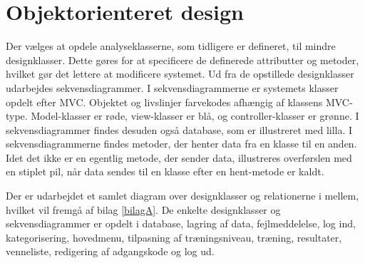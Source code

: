 \section{Objektorienteret design}
Der vælges at opdele analyseklasserne, som tidligere er defineret, til mindre designklasser. Dette gøres for at specificere de definerede attributter og metoder, hvilket gør det lettere at modificere systemet. Ud fra de opstillede designklasser udarbejdes sekvensdiagrammer. I sekvensdiagrammerne er systemets klasser opdelt efter MVC. Objektet og livslinjer farvekodes afhængig af klassens MVC-type. Model-klasser er røde, view-klasser er blå, og controller-klasser er grønne. I sekvensdiagrammer findes desuden også database, som er illustreret med lilla. I sekvensdiagrammerne findes metoder, der henter data fra en klasse til en anden. Idet det ikke er en egentlig metode, der sender data, illustreres overførslen med en stiplet pil, når data sendes til en klasse efter en hent-metode er kaldt. 

Der er udarbejdet et samlet diagram over designklasser og relationerne i mellem, hvilket vil fremgå af bilag \autoref{bilagA}. De enkelte designklasser og sekvensdiagrammer er opdelt i database, lagring af data, fejlmeddelelse, log ind, kategorisering, hovedmenu, tilpasning af træningsniveau, træning, resultater, venneliste, redigering af adgangskode og log ud. 
